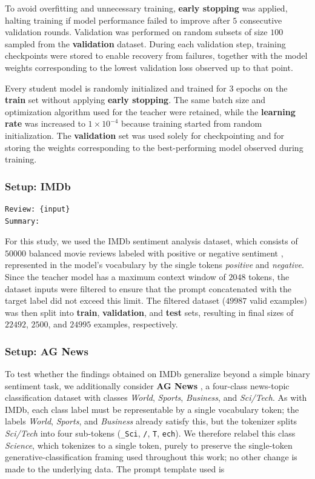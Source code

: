 \documentclass[conference]{IEEEtran}
\begin{document}
To avoid overfitting and unnecessary training, \textbf{early stopping} was applied, halting training if model performance failed to improve after $5$ consecutive validation rounds. Validation was performed on random subsets of size $100$ sampled from the \textbf{validation} dataset. During each validation step, training checkpoints were stored to enable recovery from failures, together with the model weights corresponding to the lowest validation loss observed up to that point.

Every student model is randomly initialized and trained for $3$ epochs on the \textbf{train} set without applying \textbf{early stopping}. The same batch size and optimization algorithm used for the teacher were retained, while the \textbf{learning rate} was increased to $1 \times 10^{-4}$ because training started from random initialization. The \textbf{validation} set was used solely for checkpointing and for storing the weights corresponding to the best-performing model observed during training.

\subsubsection{Setup: IMDb}\label{sec:setup-imdb}

\begin{lstlisting}
Review: {input}
Summary:
\end{lstlisting}

For this study, we used the IMDb sentiment analysis dataset, which consists of $50000$ balanced movie reviews labeled with positive or negative sentiment \cite{maas-EtAl:2011:ACL-HLT2011}, represented in the model's vocabulary by the single tokens \textit{positive} and \textit{negative}. Since the teacher model has a maximum context window of $2048$ tokens, the dataset inputs were filtered to ensure that the prompt concatenated with the target label did not exceed this limit. The filtered dataset ($49987$ valid examples) was then split into \textbf{train}, \textbf{validation}, and \textbf{test} sets, resulting in final sizes of $22492$, $2500$, and $24995$ examples, respectively.

\subsubsection{Setup: AG News}\label{sec:setup-agnews}

To test whether the findings obtained on IMDb generalize beyond a simple binary sentiment task, we additionally consider \textbf{AG News} \cite{zhang2015character}, a four-class news-topic classification dataset with classes \textit{World}, \textit{Sports}, \textit{Business}, and \textit{Sci/Tech}. As with IMDb, each class label must be representable by a single vocabulary token; the labels \textit{World}, \textit{Sports}, and \textit{Business} already satisfy this, but the tokenizer splits \textit{Sci/Tech} into four sub-tokens (\texttt{\_Sci}, \texttt{/}, \texttt{T}, \texttt{ech}). We therefore relabel this class \textit{Science}, which tokenizes to a single token, purely to preserve the single-token generative-classification framing used throughout this work; no other change is made to the underlying data. The prompt template used is
\end{document}
